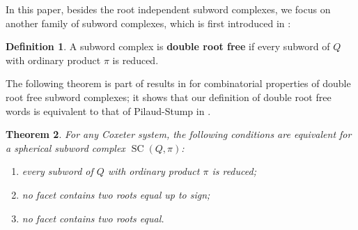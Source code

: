 \documentclass[11pt,a4paper]{article}
\newtheorem{theorem}{Theorem}[section]
\theoremstyle{definition}
\newtheorem{definition}[theorem]{Definition}
\theoremstyle{remark}
\newcommand{\SC}{\operatorname{SC}}
\numberwithin{equation}{section}
\begin{document}
In this paper, besides the root independent subword complexes, we focus on another family of subword complexes, which is first introduced in \cite{PVS}:
\begin{definition}\label{def:drf}
    A subword complex is \textbf{double root free} if every subword of $Q$ with ordinary product $\pi$ is reduced.
\end{definition}
The following theorem is part of results in \cite[Theorem~5.9]{BGS} for combinatorial properties of double root free subword complexes; it shows that our definition of double root free words is equivalent to that of Pilaud-Stump in \cite{PVS}.
\begin{theorem}\label{thm:double}
For any Coxeter system, the following conditions are equivalent for a spherical subword complex $\SC(Q,\pi)$:
\begin{enumerate}[label=\textup{(\roman*)}]
\item every subword of $Q$ with ordinary product $\pi$ is reduced;
\item no facet contains two roots equal up to sign;
\item no facet contains two roots equal.
\end{enumerate}
\end{theorem}
\end{document}
